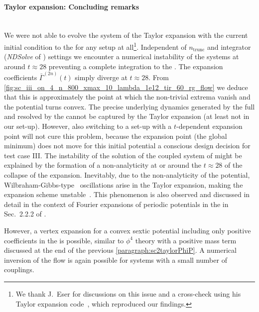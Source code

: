 \paragraph{\frg{} Taylor expansion: Concluding remarks}\label{paragraph:sc3taylorConclusion}\mbox{}\\
We were not able to evolve the \ode{} system of the Taylor expansion with the current initial condition to the \ir{} for any setup at all\footnote{%
	We thank J.~Eser for discussions on this issue and a cross-check using his \frg{} Taylor expansion code~\cite{Divotgey:2019xea,Cichutek:2020bli,Eser:2018jqo,Eser:2019pvd}, which reproduced our findings.
}. 
Independent of $n_\mathrm{trunc}$ and \ode{} integrator (\textit{NDSolve} of \WAMXIIwR{}) settings we encounter a numerical instability of the \ode{} systems at around $t \approx 28$ preventing a complete integration to the \ir{}.
The expansion coefficients $\bar{\Gamma}^{(2n)}(t)$ simply diverge at $t \approx 28$.
From \cref{fig:sc_iii_on_4_n_800_xmax_10_lambda_1e12_tir_60_rg_flow} we deduce that this is approximately the \rgtime{} point at which the non-trivial extrema vanish and the potential turns convex.
The precise underlying dynamics generated by the full \pde{} and resolved by the \ktScheme{} cannot be captured by the Taylor expansion (at least not in our set-up). 
However, also switching to a set-up with a $t$-dependent expansion point will not cure this problem, because the expansion point (the global minimum) does not move for this initial potential \dash{} a conscious design decision for test case III.
The instability of the solution of the coupled system of \odes{} might be explained \aposteriori{} by the formation of a non-analyticity at or around the \rgtime{} $t \approx 28$ of the collapse of the expansion.
Inevitably, due to the non-analyticity of the potential, Wilbraham-Gibbs-type~\cite{Wilbraham:1848,Gibbs:1898,Gibbs:1899} oscillations arise in the Taylor expansion, making the expansion scheme unstable~\cite{boyd2001chebyshev}.
This phenomenon is also observed and discussed in detail in the context of Fourier expansions of periodic potentials in the \frg{} in Sec.~2.2.2 of .

However, a vertex expansion for a convex sextic potential including only positive coefficients in the \uv{} is possible, similar to $\phi^4$ theory with a positive mass term discussed at the end of the previous \cref{paragraph:sc2taylorPhiP}.
A numerical inversion of the \frg{} flow is again possible for systems with a small number of couplings.\bigskip

